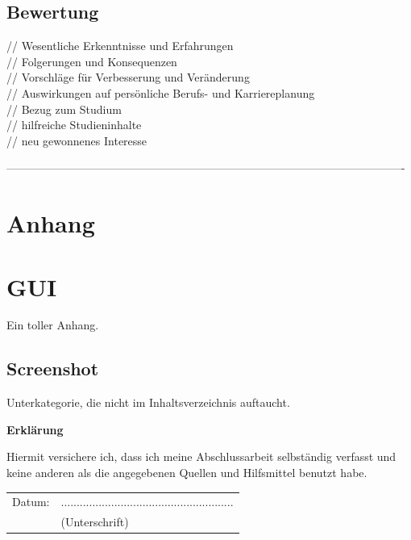 \documentclass[12pt,a4paper,bibliography=totocnumbered,listof=totocnumbered]{scrartcl}
\begin{document}
\subsection{Bewertung}
// Wesentliche Erkenntnisse und Erfahrungen\\
// Folgerungen und Konsequenzen\\
// Vorschläge für Verbesserung und Veränderung\\
// Auswirkungen auf persönliche Berufs- und Karriereplanung\\
// Bezug zum Studium\\
// hilfreiche Studieninhalte\\
// neu gewonnenes Interesse\\
\pagebreak

%
----------------------------------------------------------------------------------------------------------
\renewcommand\refname{Quellenverzeichnis}


\pagebreak

\setcounter{page}{1}

\begin{appendix}
\section*{Anhang}
{}

\section{GUI}
Ein toller Anhang.

\subsection*{Screenshot}
\label{app:screenshot}
Unterkategorie, die nicht im Inhaltsverzeichnis auftaucht.

\end{appendix}

\newpage
\thispagestyle{empty}
\begin{center}
	\vspace*{5em}
	\huge\textbf{Erklärung}\\
\end{center}
\vspace{2em}
Hiermit versichere ich, dass ich meine Abschlussarbeit selbständig verfasst und keine anderen als die angegebenen Quellen und Hilfsmittel benutzt habe.

\vspace{4em}
\begin{minipage}{\linewidth}
	\begin{tabular}{p{15em}p{15em}}
		Datum: &  .......................................................\\
		& \centering (Unterschrift)\\
	\end{tabular}
\end{minipage}
\end{document}
